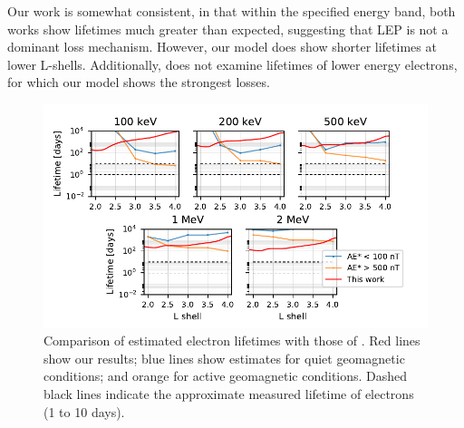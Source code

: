 Our work is somewhat consistent, in that within the specified energy band, both works show lifetimes much greater than expected, suggesting that LEP is not a dominant loss mechanism. However, our model does show shorter lifetimes at lower L-shells. Additionally, \citeauthor{Meredith2007} does not examine lifetimes of lower energy electrons, for which our model shows the strongest losses. 
\begin{figure}[]
\begin{center}
\includegraphics{figures/Meredith_comparison_thesis.pdf}
\caption[Electron lifetime estimates compared against \cite{Meredith2007}]{Comparison of estimated electron lifetimes with those of \cite{Meredith2007}. Red lines show our results; blue lines show \cite{Meredith2007} estimates for quiet geomagnetic conditions; and orange for active geomagnetic conditions. Dashed black lines indicate the approximate measured lifetime of electrons (1 to 10 days).}
\label{fig:Meredith_comparison}
\end{center}
\end{figure}

